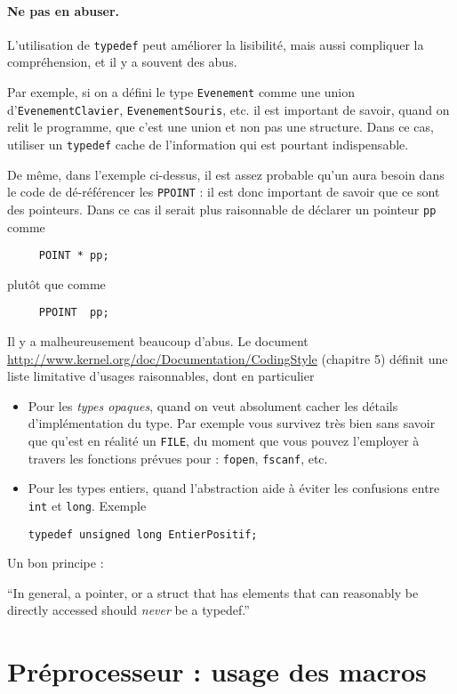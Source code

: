 \documentclass[10pt]{article}
\begin{document}
\paragraph{Ne pas en abuser.} L'utilisation de \texttt{typedef}
peut améliorer la lisibilité, mais aussi compliquer la compréhension, et il y a souvent
des abus.

Par exemple, si on a défini le type \texttt{Evenement} comme une union
d'\texttt{EvenementClavier}, \texttt{EvenementSouris}, etc. il est
important de savoir, quand on relit le programme, que c'est une union
et non pas une structure. Dans ce cas, utiliser un \texttt{typedef}
cache de l'information qui est pourtant indispensable.

De même, dans l'exemple ci-dessus, il est assez probable qu'un aura
besoin dans le code de dé-référencer les \texttt{PPOINT} : il est donc
important de savoir que ce sont des pointeurs. Dans ce cas il serait
plus raisonnable de déclarer un pointeur \texttt{pp} comme
\begin{lstlisting}
     POINT * pp;
\end{lstlisting}
plutôt que comme
\begin{lstlisting}
     PPOINT  pp;
\end{lstlisting}
Il y a malheureusement beaucoup d'abus. Le document
\url{http://www.kernel.org/doc/Documentation/CodingStyle} (chapitre 5)
définit une liste limitative d'usages raisonnables, dont en
particulier
\begin{itemize}
\item Pour les \emph{types opaques}, quand on veut absolument cacher
  les détails d'implémentation du type. Par exemple vous survivez très
  bien sans savoir que qu'est en réalité un \texttt{FILE}, du moment
  que vous pouvez l'employer à travers les fonctions prévues pour :
  \texttt{fopen}, \texttt{fscanf}, etc.
\item Pour les types entiers, quand l'abstraction aide à éviter les confusions entre \texttt{int} et \texttt{long}. Exemple
\begin{lstlisting}
typedef unsigned long EntierPositif;
\end{lstlisting}
\end{itemize}
Un bon principe : 
\begin{citation}
``In general, a pointer, or a struct that has elements that can reasonably
be directly accessed should \emph{never} be a typedef.''
\end{citation}


\section{Préprocesseur : usage des macros}
\end{document}
